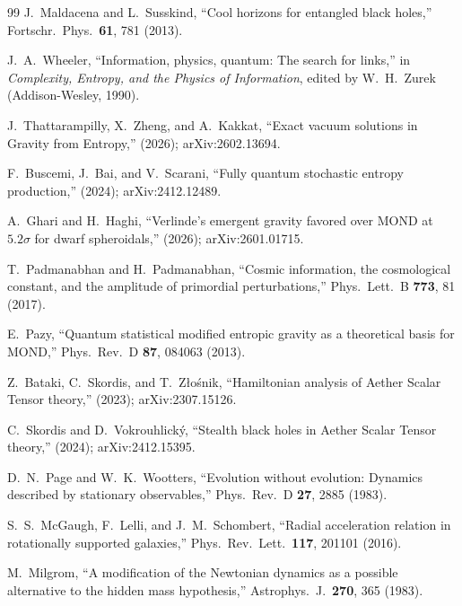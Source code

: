 \documentclass[prd,twocolumn,superscriptaddress,longbibliography,floatfix]{revtex4-2}
\begin{document}
\begin{thebibliography}{99}
J.~Maldacena and L.~Susskind,
``Cool horizons for entangled black holes,''
Fortschr.\ Phys.\ \textbf{61}, 781 (2013).

J.~A.~Wheeler,
``Information, physics, quantum: The search for
links,'' in \emph{Complexity, Entropy, and the Physics
of Information}, edited by W.~H.~Zurek (Addison-Wesley,
1990).

J.~Thattarampilly, X.~Zheng, and A.~Kakkat,
``Exact vacuum solutions in Gravity from Entropy,''
(2026); arXiv:2602.13694.

F.~Buscemi, J.~Bai, and V.~Scarani,
``Fully quantum stochastic entropy production,''
(2024); arXiv:2412.12489.

A.~Ghari and H.~Haghi,
``Verlinde's emergent gravity favored over MOND at
$5.2\sigma$ for dwarf spheroidals,''
(2026); arXiv:2601.01715.

T.~Padmanabhan and H.~Padmanabhan,
``Cosmic information, the cosmological constant,
and the amplitude of primordial perturbations,''
Phys.\ Lett.\ B \textbf{773}, 81 (2017).

E.~Pazy,
``Quantum statistical modified entropic gravity as a
theoretical basis for MOND,''
Phys.\ Rev.\ D \textbf{87}, 084063 (2013).

Z.~Bataki, C.~Skordis, and T.~Z\l{}o\'{s}nik,
``Hamiltonian analysis of Aether Scalar Tensor theory,''
(2023); arXiv:2307.15126.

C.~Skordis and D.~Vokrouhlick\'{y},
``Stealth black holes in Aether Scalar Tensor theory,''
(2024); arXiv:2412.15395.

D.~N.~Page and W.~K.~Wootters,
``Evolution without evolution: Dynamics described by
stationary observables,''
Phys.\ Rev.\ D \textbf{27}, 2885 (1983).

S.~S.~McGaugh, F.~Lelli, and J.~M.~Schombert,
``Radial acceleration relation in rotationally supported
galaxies,''
Phys.\ Rev.\ Lett.\ \textbf{117}, 201101 (2016).

M.~Milgrom,
``A modification of the Newtonian dynamics as a possible
alternative to the hidden mass hypothesis,''
Astrophys.\ J.\ \textbf{270}, 365 (1983).


\end{thebibliography}
\end{document}
